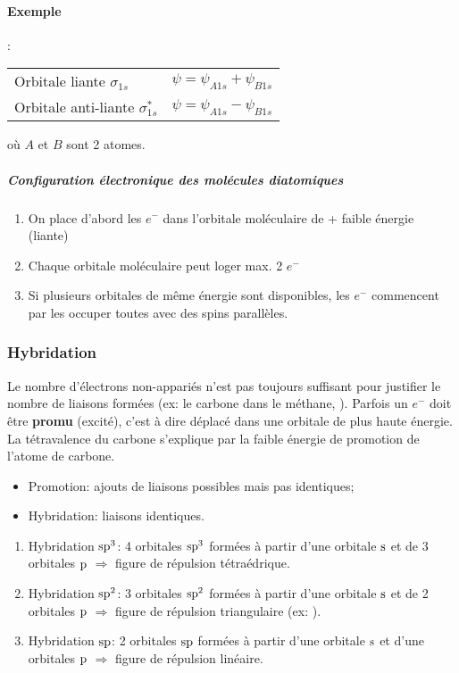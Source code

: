 \paragraph{Exemple}
:
\begin{center}
  \begin{tabular}{ll}
    Orbitale liante $\sigma_{1s}$ & $\psi=\psi_{A1s}+\psi_{B1s}$\\
    Orbitale anti-liante $\sigma^{*}_{1s}$ & $\psi=\psi_{A1s}-\psi_{B1s}$
  \end{tabular}
\end{center}
où $A$ et $B$ sont 2 atomes.

\subparagraph{Configuration électronique des molécules diatomiques}
\begin{enumerate}
  \item On place d'abord les $e^-$ dans l'orbitale moléculaire de + faible énergie (liante)
  \item Chaque orbitale moléculaire peut loger max. 2 $e^-$
  \item Si plusieurs orbitales de même énergie sont disponibles,
    les $e^-$ commencent par les occuper toutes avec des spins parallèles.
\end{enumerate}

\subsubsection{Hybridation}

Le nombre d'électrons non-appariés n'est pas toujours suffisant pour justifier le nombre de liaisons formées (ex: le carbone dans le méthane,
).
Parfois un $e^-$ doit être \textbf{promu} (excité),
c'est à dire déplacé dans une orbitale de plus haute énergie.
La tétravalence du carbone s'explique par la faible énergie de promotion de l'atome de carbone.
\begin{itemize}
  \item Promotion: ajouts de liaisons possibles mais pas identiques;
  \item Hybridation: liaisons identiques.
\end{itemize}
\begin{enumerate}
  \item Hybridation $\mathrm{s}\mathrm{p}^3$: 4 orbitales $\mathrm{s}\mathrm{p}^3$ formées à partir d'une orbitale $\mathrm{s}$ et de 3 orbitales $\mathrm{p}$ $\Rightarrow$ figure de répulsion tétraédrique.
  \item Hybridation $\mathrm{s}\mathrm{p}^2$: 3 orbitales $\mathrm{s}\mathrm{p}^2$ formées à partir d'une orbitale $\mathrm{s}$ et de 2 orbitales $\mathrm{p}$ $\Rightarrow$ figure de répulsion triangulaire (ex: ).
  \item Hybridation $\mathrm{s}\mathrm{p}$: 2 orbitales $\mathrm{s}\mathrm{p}$ formées à partir d'une orbitale $\mathrm{s}$ et d'une orbitales $\mathrm{p}$ $\Rightarrow$ figure de répulsion linéaire.
\end{enumerate}

